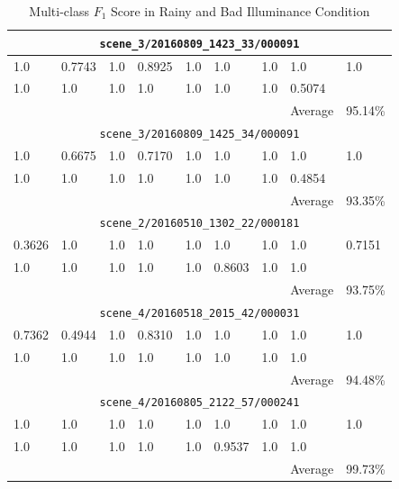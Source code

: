 \begin{spacing}{1.5}
\begin{table}[p]
\centering
\caption{Multi-class $F_1$ Score in Rainy and Bad Illuminance Condition}
\label{tab:rainyf1}
\begin{tabular}{@{}lllllllll@{}}
\toprule
\multicolumn{9}{c}{\texttt{scene\_3/20160809\_1423\_33/000091}} \\ \midrule
1.0 & 0.7743 & 1.0 & 0.8925 & 1.0 & 1.0 & 1.0 & 1.0 & 1.0 \\
1.0 & 1.0 & 1.0 & 1.0 & 1.0 & 1.0 & 1.0 & 0.5074 &  \\
 &  &  &  &  &  &  & Average & 95.14\% \\ \midrule
\multicolumn{9}{c}{\texttt{scene\_3/20160809\_1425\_34/000091}} \\ \midrule
1.0 & 0.6675 & 1.0 & 0.7170 & 1.0 & 1.0 & 1.0 & 1.0 & 1.0 \\
1.0 & 1.0 & 1.0 & 1.0 & 1.0 & 1.0 & 1.0 & 0.4854 &  \\
 &  &  &  &  &  &  & Average & 93.35\% \\ \midrule
\multicolumn{9}{c}{\texttt{scene\_2/20160510\_1302\_22/000181}} \\ \midrule
0.3626 & 1.0 & 1.0 & 1.0 & 1.0 & 1.0 & 1.0 & 1.0 & 0.7151 \\
1.0 & 1.0 & 1.0 & 1.0 & 1.0 & 0.8603 & 1.0 & 1.0 &  \\
 &  &  &  &  &  &  & Average & 93.75\% \\ \midrule
\multicolumn{9}{c}{\texttt{scene\_4/20160518\_2015\_42/000031}} \\ \midrule
0.7362 & 0.4944 & 1.0 & 0.8310 & 1.0 & 1.0 & 1.0 & 1.0 & 1.0 \\
1.0 & 1.0 & 1.0 & 1.0 & 1.0 & 1.0 & 1.0 & 1.0 &  \\
 &  &  &  &  &  &  & Average & 94.48\% \\ \midrule
\multicolumn{9}{c}{\texttt{scene\_4/20160805\_2122\_57/000241}} \\ \midrule
1.0 & 1.0 & 1.0 & 1.0 & 1.0 & 1.0 & 1.0 & 1.0 & 1.0 \\
1.0 & 1.0 & 1.0 & 1.0 & 1.0 & 0.9537 & 1.0 & 1.0 &  \\
 &  &  &  &  &  &  & Average & 99.73\% \\ \bottomrule
\end{tabular}
\end{table}



\end{spacing}
